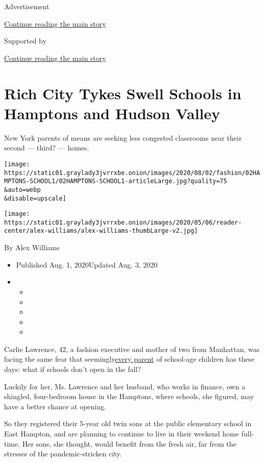Advertisement

\protect\hyperlink{after-top}{Continue reading the main story}

Supported by

\protect\hyperlink{after-sponsor}{Continue reading the main story}

\hypertarget{rich-city-tykes-swell-schools-in-hamptons-and-hudson-valley}{%
\section{Rich City Tykes Swell Schools in Hamptons and Hudson
Valley}\label{rich-city-tykes-swell-schools-in-hamptons-and-hudson-valley}}

New York parents of means are seeking less congested classrooms near
their second --- third? --- homes.

\texttt{[image: https://static01.graylady3jvrrxbe.onion/images/2020/08/02/fashion/02HAMPTONS-SCHOOL1/02HAMPTONS-SCHOOL1-articleLarge.jpg?quality=75\\\&auto=webp\\\&disable=upscale]}

\texttt{[image: https://static01.graylady3jvrrxbe.onion/images/2020/05/06/reader-center/alex-williams/alex-williams-thumbLarge-v2.jpg]}

By Alex Williams

\begin{itemize}
\item
  Published Aug. 1, 2020Updated Aug. 3, 2020
\item
  \begin{itemize}
  \item
  \item
  \item
  \item
  \item
  \end{itemize}
\end{itemize}

Carlie Lawrence, 42, a fashion executive and mother of two from
Manhattan, was facing the same fear that
seemingly\href{https://www.nytimes3xbfgragh.onion/2020/07/30/nyregion/pod-schools-hastings-on-hudson.html}{every
parent} of school-age children has these days: what if schools don't
open in the fall?

Luckily for her, Ms. Lawrence and her husband, who works in finance, own
a shingled, four-bedroom house in the Hamptons, where schools, she
figured, may have a better chance at opening.

So they registered their 5-year old twin sons at the public elementary
school in East Hampton, and are planning to continue to live in their
weekend home full-time. Her sons, she thought, would benefit from the
fresh air, far from the stresses of the pandemic-stricken city.

